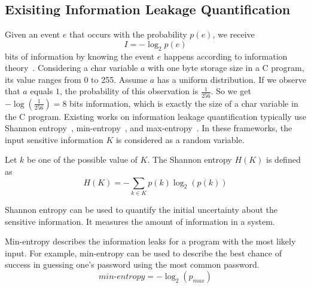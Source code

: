 
\subsection{Exisiting Information Leakage Quantification}\label{sec:background_leak}

Given an event $e$ that occurs with the probability $p(e)$, we receive
\begin{displaymath}
    I = - \log_2p(e)
\end{displaymath}
bits of information by knowing the event $e$ happens according to information theory~\cite{shannon1948mathematical}. 
Considering a char variable $a$
with one byte storage size in a C program, its value ranges from 0 to 255.
Assume $a$ has a uniform distribution. If we observe that
$a$ equals $1$, the probability of this observation is $\frac{1}{256}$. So 
we get $-\log(\frac{1}{256}) = 8$ bits information, which is exactly the size
of a char variable in the C program.
Existing works on information leakage quantification typically use Shannon
entropy~\cite{clark2007static,Wichelmann:2018:MFF:3274694.3274741},
min-entropy~\cite{10.1007/978-3-642-00596-1_21}, and max-entropy~\cite{182946,
Doychev:2017:RAS:3062341.3062388}. In these frameworks, the input sensitive
information $K$ is considered as a random variable.

Let $k$ be one of the possible
value of $K$. The Shannon entropy $H(K)$ is defined as
\begin{displaymath}
    H(K) = - \sum_{k {\in} K}p(k)\log_2(p(k))
\end{displaymath}

Shannon entropy can be used to quantify the initial uncertainty about the
sensitive information. It measures the amount of information in a system.

Min-entropy describes the information leaks for a program with the most likely input. 
For example, min-entropy can be used to describe the
best chance of success in guessing one's password using the
most common password. %
\begin{displaymath}
    \mathit{min\text{-}entropy} = - \log_2(p_{\mathit{max}})
\end{displaymath}

